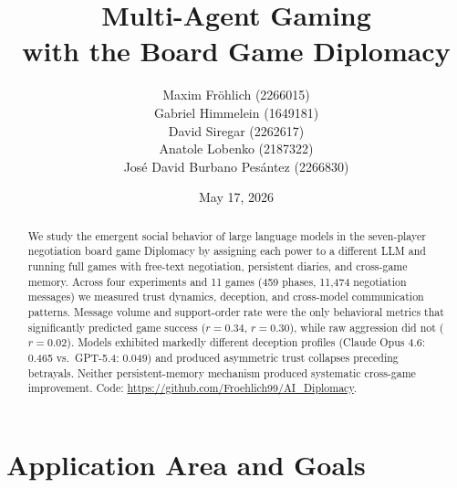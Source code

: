 \documentclass[a4paper,oneside,bibliography=totoc]{scrartcl}
\begin{document}
\subject{Project Report \textbar{} Team 1} %
\title{Multi-Agent Gaming \\with the Board Game Diplomacy}
\author{
  Maxim Fr\"ohlich (2266015)\\
  Gabriel Himmelein (1649181)\\
  David Siregar (2262617)\\
  Anatole Lobenko (2187322)\\
  Jos\'e David Burbano Pes\'antez (2266830)
} \date{May 17, 2026}
\maketitle

\begin{abstract}
We study the emergent social behavior of large language models in the seven-player negotiation board game Diplomacy by assigning each power to a different LLM and running full games with free-text negotiation, persistent diaries, and cross-game memory. Across four experiments and 11 games (459 phases, 11{,}474 negotiation messages) we measured trust dynamics, deception, and cross-model communication patterns. Message volume and support-order rate were the only behavioral metrics that significantly predicted game success ($r{=}0.34$, $r{=}0.30$), while raw aggression did not ($r{=}0.02$). Models exhibited markedly different deception profiles (Claude Opus 4.6: 0.465 vs.\ GPT-5.4: 0.049) and produced asymmetric trust collapses preceding betrayals. Neither persistent-memory mechanism produced systematic cross-game improvement. Code: \url{https://github.com/Froehlich99/AI_Diplomacy}.
\end{abstract}

\clearpage
\pagestyle{plain}

\section{Application Area and Goals}
\end{document}
